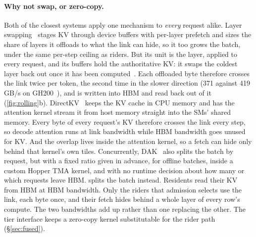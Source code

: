 \paragraph{Why not swap, or zero-copy.} Both of the closest systems apply one
mechanism to \emph{every} request alike. Layer swapping~\cite{pie} stages KV
through device buffers with per-layer prefetch and sizes the share of layers it
offloads to what the link can hide, so it too grows the batch, under the same
per-step ceiling as riders. But its unit is the layer, applied to every
request, and its buffers hold the authoritative KV: it swaps the coldest layer
back out once it has been computed~\cite{pie}. Each offloaded byte therefore
crosses the link twice per token, the second time in the slower direction
(371 against 419\,GB/s on GH200~\cite{pie}), and is written into HBM and read
back out of it (\cref{fig:rolling}b). DirectKV~\cite{directkv} keeps the KV cache in CPU memory
and has the attention kernel stream it from host memory straight into the SMs'
shared memory. Every byte of every request's KV therefore crosses the link every
step, so decode attention runs at link bandwidth while HBM bandwidth goes unused
for KV. And the overlap lives inside the attention kernel, so a fetch can hide
only behind that kernel's own tiles. Concurrently, DAK~\cite{dak} also splits
the batch by request, but with a fixed ratio given in advance, for offline
batches, inside a custom Hopper TMA kernel, and with no runtime decision about
how many or which requests leave HBM.
\sysname{} splits the batch instead. Residents
read their KV from HBM at HBM bandwidth. Only the riders that admission selects
use the link, each byte once, and their fetch hides behind a whole layer of
every row's compute. The two bandwidths add up rather than one replacing the
other. The tier interface keeps a zero-copy kernel substitutable for the
rider path (\S\ref{sec:fused}).

